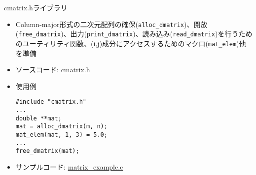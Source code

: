 \begin{frame}[t,fragile]{cmatrix.hライブラリ}
  \begin{itemize}
  \item Column-major形式の二次元配列の確保({\tt alloc\_dmatrix})、開放({\tt free\_dmatrix})、出力({\tt print\_dmatrix})、読み込み({\tt read\_dmatrix})を行うためのユーティリティ関数、(i,j)成分にアクセスするためのマクロ({\tt mat\_elem})他を準備
  \item ソースコード: \href{https://github.com/todo-group/computer-experiments/blob/master/exercise/include/cmatrix.h}{cmatrix.h}
  \item 使用例
\begin{lstlisting}
#include "cmatrix.h"
...
double **mat;
mat = alloc_dmatrix(m, n);
mat_elem(mat, 1, 3) = 5.0;
...
free_dmatrix(mat);
\end{lstlisting}
  \item サンプルコード: \href{https://github.com/todo-group/computer-experiments/blob/master/exercise/matrix/matrix_example.c}{matrix\_example.c}
  \end{itemize}
\end{frame}
